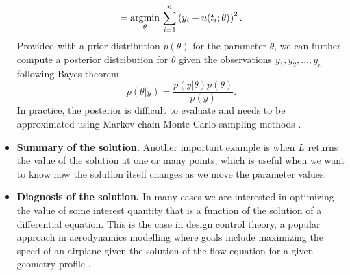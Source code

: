 \begin{itemize}
\begin{equation}
        = 
        \underset{\theta}{\text{argmin}} \, \sum_{i=1}^n \left( y_i - u(t_i; \theta) \right)^2 .
    \end{equation}
    Provided with a prior distribution $p(\theta)$ for the parameter $\theta$, we can further compute a posterior distribution for $\theta$ given the observations $y_1, y_2, \ldots, y_n$ following Bayes theorem 
    \begin{equation}
        p(\theta | y) = \frac{p(y | \theta) p (\theta)}{p(y)}. 
    \end{equation}
    In practice, the posterior is difficult to evaluate and needs to be approximated using Markov chain Monte Carlo sampling methods \cite{gelman2013bayesian}.
    \item \textbf{Summary of the solution.} Another important example is when $L$ returns the value of the solution at one or many points, which is useful when we want to know how the solution itself changes as we move the parameter values. 
    \item \textbf{Diagnosis of the solution.} In many cases we are interested in optimizing the value of some interest quantity that is a function of the solution of a differential equation. This is the case in design control theory, a popular approach in aerodynamics modelling where goals include maximizing the speed of an airplane given the solution of the flow equation for a given geometry profile \cite{Jameson_1988}. 
\end{itemize}


